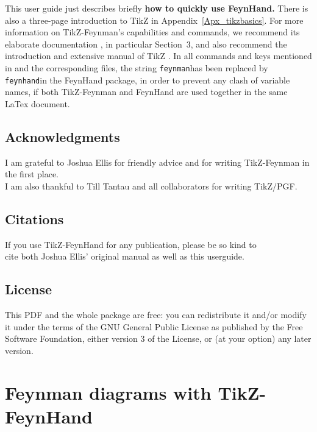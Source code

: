 \documentclass[10pt,letterpaper,twoside,notitlepage]{article}
\numberwithin{figure}{section}
\begin{document}
%
This user guide just describes briefly \textbf{how to quickly use FeynHand.}
There is also a three-page introduction to TikZ in Appendix~\ref{Apx_tikzbasics}.
For more information on TikZ-Feynman's capabilities and commands, 
we recommend its elaborate documentation \cite{tikzfeynman}, 
in particular Section~3, and also recommend the introduction 
and extensive manual of TikZ \cite{tikz}.
%
In all commands and keys mentioned in \cite{tikzfeynmanArticle}
and the corresponding files, the string \vercol\verb$feynman$\txcol has been replaced
by \vercol\verb$feynhand$\txcol in the FeynHand package,
in order to prevent any clash of variable names, 
if both TikZ-Feynman and FeynHand are used together in the same LaTex document.
%
%
\subsection*{Acknowledgments}
%
\noindent
I am grateful to Joshua Ellis for friendly advice 
and for writing TikZ-Feynman in the first place.\\
I am also thankful to Till Tantau and all collaborators for writing TikZ/PGF.
%
%
%
\subsection*{Citations}
%
\noindent
If you use TikZ-FeynHand for any publication, please be so kind to\\
cite both Joshua Ellis' original manual \cite{tikzfeynmanArticle} as well as this userguide.
%
%
\subsection*{License}
%
\noindent
This PDF and the whole package are free: you can redistribute it and/or modify it under the
terms of the GNU General Public License as published by the Free Software
Foundation, either version 3 of the License, or (at your option) any later version.
%
%
\newpage
\section{Feynman diagrams with TikZ-FeynHand}
\label{sec:_feynmandiagrams}
%
%
\end{document}
